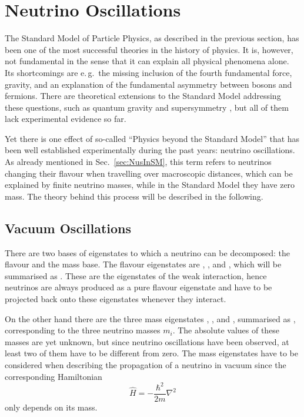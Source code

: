 \section{Neutrino Oscillations}
\label{sec:osc}

The Standard Model of Particle Physics, as described in the previous section,
has been one of the most successful theories in the history of physics. It is,
however, not fundamental in the sense that it can explain all physical
phenomena alone. Its shortcomings are e.\,g.\ the missing inclusion of the
fourth fundamental force, gravity, and an explanation of the fundamental
asymmetry between bosons and fermions.
There are theoretical extensions to the Standard Model addressing these
questions, such as quantum gravity \cite{QuantumGravity} and supersymmetry
\cite{SUSY}, but all of them lack experimental evidence so far.

Yet there is one effect of so-called ``Physics beyond the Standard Model'' that
has been well established experimentally during the past years: neutrino
oscillations. As already mentioned in Sec.~\ref{sec:NusInSM}, this term refers
to neutrinos changing their flavour when travelling over macroscopic distances,
which can be explained by finite neutrino masses, while in the Standard Model
they have zero mass. The theory behind this process will be described in the
following.

\subsection{Vacuum Oscillations}
\label{sec:VacOsc}


There are two bases of eigenstates to which a neutrino can be decomposed: the
flavour and the mass base. The flavour eigenstates are \ket{\nue}, \ket{\numu},
and \ket{\nutau}, which will be summarised as \ket{\nu_\alpha}. These are the
eigenstates of the weak interaction, hence neutrinos are always produced as a
pure flavour eigenstate and have to be projected back onto these eigenstates
whenever they interact.

On the other hand there are the three mass eigenstates , ,
and , summarised as , corresponding to the three neutrino
masses $m_i$. The absolute values of these masses are yet unknown, but since
neutrino oscillations have been observed, at least two of them have to be
different from zero. The mass eigenstates have to be considered when describing
the propagation of a neutrino in vacuum since the corresponding Hamiltonian
\begin{equation}
 \hat{H} = -\frac{\hbar^2}{2m}\nabla^2
\end{equation}
only depends on its mass.

